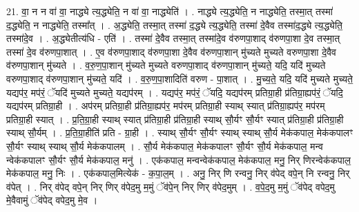 \documentclass[17pt]{extarticle}
\begin{document}
21. वा॒ न न वा॑ वा॒ नाद्ध्ये त्य॒द्ध्येति॒ न वा॑ वा॒ नाद्ध्येति॑ । . नाद्ध्ये त्य॒द्ध्येति॒ न नाद्ध्येति॒ तस्मा॒त् तस्मा॑ द॒द्ध्येति॒ न नाद्ध्येति॒ तस्मा᳚त् । . अ॒द्ध्येति॒ तस्मा॒त् तस्मा॑ द॒द्ध्ये त्य॒द्ध्येति॒ तस्मा॑ दे॒वैव तस्मा॑द॒द्ध्ये त्य॒द्ध्येति॒ तस्मा॑दे॒व । . अ॒द्ध्येतीत्य॑धि - एति॑ । . तस्मा॑ दे॒वैव तस्मा॒त् तस्मा॑दे॒व व॑रुणपा॒शाद् व॑रुणपा॒शा दे॒व तस्मा॒त् तस्मा॑ दे॒व व॑रुणपा॒शात् । . ए॒व व॑रुणपा॒शाद् व॑रुणपा॒शा दे॒वैव व॑रुणपा॒शान् मु॑च्यते मुच्यते वरुणपा॒शा दे॒वैव व॑रुणपा॒शान् मु॑च्यते । . व॒रु॒ण॒पा॒शान् मु॑च्यते मुच्यते वरुणपा॒शाद् व॑रुणपा॒शान् मु॑च्यते॒ यदि॒ यदि॑ मुच्यते वरुणपा॒शाद् व॑रुणपा॒शान् मु॑च्यते॒ यदि॑ । . व॒रु॒ण॒पा॒शादिति॑ वरुण - पा॒शात् । . मु॒च्य॒ते॒ यदि॒ यदि॑ मुच्यते मुच्यते॒ यद्यप॑र॒ मप॑रं॒ ॅयदि॑ मुच्यते मुच्यते॒ यद्यप॑रम् । . यद्यप॑र॒ मप॑रं॒ ॅयदि॒ यद्यप॑रम् प्रतिग्रा॒ही प्र॑तिग्रा॒ह्यप॑रं॒ ॅयदि॒ यद्यप॑रम् प्रतिग्रा॒ही । . अप॑रम् प्रतिग्रा॒ही प्र॑तिग्रा॒ह्यप॑र॒ मप॑रम् प्रतिग्रा॒ही स्याथ् स्यात् प्र॑तिग्रा॒ह्यप॑र॒ मप॑रम् प्रतिग्रा॒ही स्यात् । . प्र॒ति॒ग्रा॒ही स्याथ् स्यात् प्र॑तिग्रा॒ही प्र॑तिग्रा॒ही स्याथ् सौ॒र्यꣳ सौ॒र्यꣳ स्यात् प्र॑तिग्रा॒ही प्र॑तिग्रा॒ही स्याथ् सौ॒र्यम् । . प्र॒ति॒ग्रा॒हीति॑ प्रति - ग्रा॒ही । . स्याथ् सौ॒र्यꣳ सौ॒र्यꣳ स्याथ् स्याथ् सौ॒र्य मेक॑कपाल॒ मेक॑कपालꣳ सौ॒र्यꣳ स्याथ् स्याथ् सौ॒र्य मेक॑कपालम् । . सौ॒र्य मेक॑कपाल॒ मेक॑कपालꣳ सौ॒र्यꣳ सौ॒र्य मेक॑कपाल॒ मन्व न्वेक॑कपालꣳ सौ॒र्यꣳ सौ॒र्य मेक॑कपाल॒ मनु॑ । . एक॑कपाल॒ मन्वन्वेक॑कपाल॒ मेक॑कपाल॒ मनु॒ निर् णिरन्वेक॑कपाल॒ मेक॑कपाल॒ मनु॒ निः । . एक॑कपाल॒मित्येक॑ - क॒पा॒ल॒म् । . अनु॒ निर् णि रन्वनु॒ निर् व॑पेद् वपे॒न् नि रन्वनु॒ निर् व॑पेत् । . निर् व॑पेद् वपे॒न् निर् णिर् व॑पेद॒मु म॒मुं ॅव॑पे॒न् निर् णिर् व॑पेद॒मुम् । . व॒पे॒द॒मु म॒मुं ॅव॑पेद् वपेद॒मु मे॒वैवामुं ॅव॑पेद् वपेद॒मु मे॒व । \newline
\end{document}
